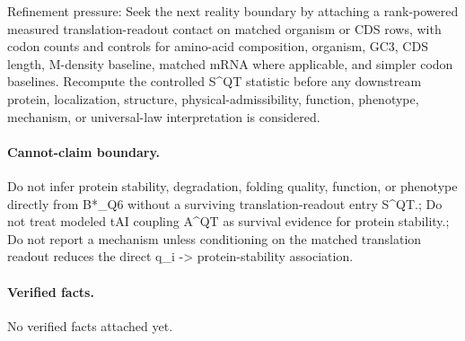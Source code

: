 Refinement pressure: Seek the next reality boundary by attaching a rank-powered measured translation-readout contact on matched organism or CDS rows, with codon counts and controls for amino-acid composition, organism, GC3, CDS length, M-density baseline, matched mRNA where applicable, and simpler codon baselines. Recompute the controlled S\textasciicircum{}QT statistic before any downstream protein, localization, structure, physical-admissibility, function, phenotype, mechanism, or universal-law interpretation is considered.

\paragraph{Cannot-claim boundary.} Do not infer protein stability, degradation, folding quality, function, or phenotype directly from B*\_Q6 without a surviving translation-readout entry S\textasciicircum{}QT.; Do not treat modeled tAI coupling A\textasciicircum{}QT as survival evidence for protein stability.; Do not report a mechanism unless conditioning on the matched translation readout reduces the direct q\_i -> protein-stability association.

\paragraph{Verified facts.}
No verified facts attached yet.

